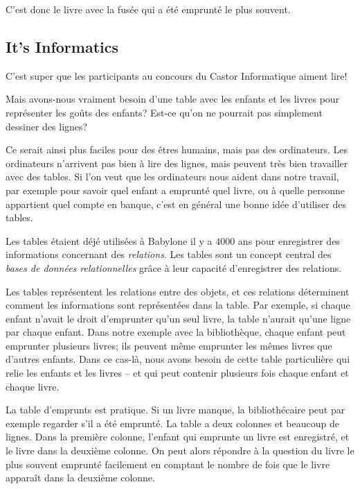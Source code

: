 \documentclass[a4paper,11pt]{report}
\newcommand{\taskGraphicsFolder}{..}
\begin{document}
{\centering%
\par}

C’est donc le livre avec la fusée qui a été emprunté le plus souvent.


\subsection*{It’s Informatics}

C’est super que les participants au concours du Castor Informatique aiment lire!

Mais avons-nous vraiment besoin d’une table avec les enfants et les livres pour représenter les goûts des enfants? Est-ce qu’on ne pourrait pas simplement dessiner des lignes?

{\centering%
\par}

Ce serait ainsi plus faciles pour des êtres humains, mais pas des ordinateurs. Les ordinateurs n’arrivent pas bien à lire des lignes, mais peuvent très bien travailler avec des tables. Si l’on veut que les ordinateurs nous aident dans notre travail, par exemple pour savoir quel enfant a emprunté quel livre, ou à quelle personne appartient quel compte en banque, c’est en général une bonne idée d’utiliser des tables.

Les tables étaient déjé utilisées à Babylone il y a $4000$ ans pour enregistrer des informations concernant des \emph{relations}.  Les tables sont un concept central des \emph{bases de données relationnelles} grâce à leur capacité d’enregistrer des relations.

Les tables représentent les relations entre des objets, et ces relations déterminent comment les informations sont représentées dans la table. Par exemple, si chaque enfant n’avait le droit d’emprunter qu’un seul livre, la table n’aurait qu’une ligne par chaque enfant. Dans notre exemple avec la bibliothèque, chaque enfant peut emprunter plusieurs livres; ils peuvent même emprunter les mêmes livres que d’autres enfants. Dans ce cas-là, nous avons besoin de cette table particulière qui relie les enfants et les livres – et qui peut contenir plusieurs fois chaque enfant et chaque livre.

La table d’emprunts est pratique. Si un livre manque, la bibliothécaire peut par exemple regarder s’il a été emprunté. La table a deux colonnes et beaucoup de lignes. Dans la première colonne, l’enfant qui emprunte un livre est enregistré, et le livre dans la deuxième colonne. On peut alors répondre à la question du livre le plus souvent emprunté facilement en comptant le nombre de fois que le livre apparaît dans la deuxième colonne.
\end{document}

